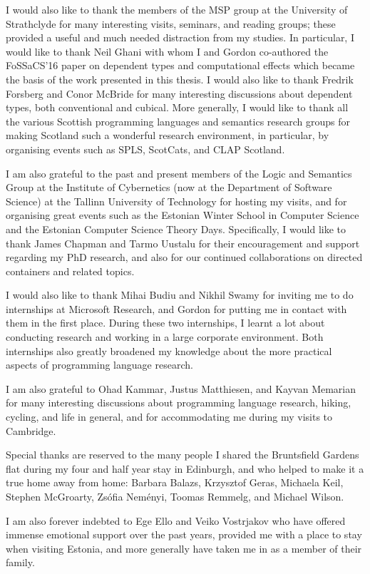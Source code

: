 \documentclass[phd,lfcs,twoside,logo]{infthesis}
\theoremstyle{definition}
\begin{document}
\begin{preliminary}
\begin{acknowledgements}
I would also like to thank the members of the MSP group at the University of Strathclyde for many interesting visits, seminars, and reading groups; these provided a useful and much needed distraction  from my studies. In particular, I would like to thank Neil Ghani with whom I and Gordon co-authored the FoSSaCS'16 paper on dependent types and computational effects which became the basis of the work presented in this thesis. I would also like to thank Fredrik Forsberg and Conor McBride for many interesting discussions about dependent types, both conventional and cubical. More generally, I would like to thank all the various Scottish programming languages and semantics research groups for making Scotland such a wonderful research environment, in particular, by organising events such as SPLS, ScotCats, and CLAP Scotland.

I am also grateful to the past and present members of the Logic and Semantics Group at the 
Institute of Cybernetics (now at the Department of 
Software Science) at the Tallinn University of Technology for hosting my visits, and for organising great events such as the Estonian Winter School in Computer Science and the Estonian Computer Science Theory Days. Specifically, I would like to thank James Chapman and Tarmo Uustalu for their encouragement and support regarding my PhD research, and also for our continued  collaborations on directed containers and related topics.

I would also like to thank Mihai Budiu and Nikhil Swamy for inviting me to do internships 
at Microsoft Research, and Gordon for putting me in contact with them in the 
first place. During these two internships, I learnt a lot about conducting research and working in a large   corporate environment. Both internships also greatly broadened my knowledge about the more practical aspects of programming language research.

I am also grateful to Ohad Kammar, Justus Matthiesen, and Kayvan Memarian for many 
interesting discussions about programming language research, hiking, cycling, and life in general, 
and for accommodating me during my visits to Cambridge.

Special thanks are reserved to the many people I shared the Bruntsfield Gardens flat during my four and half year stay in Edinburgh, and who helped to make it a true home away from home: Barbara Balazs, Krzysztof Geras, Michaela Keil, Stephen McGroarty, Zs\'{o}fia Nem\'{e}nyi, Toomas Remmelg, and Michael Wilson. 

I am also forever indebted to Ege Ello and Veiko Vostrjakov who have offered immense emotional support over the past years, provided me with a place to stay when visiting Estonia, and more generally have taken me in as a member of their family.


\end{acknowledgements}
\end{preliminary}
\end{document}
